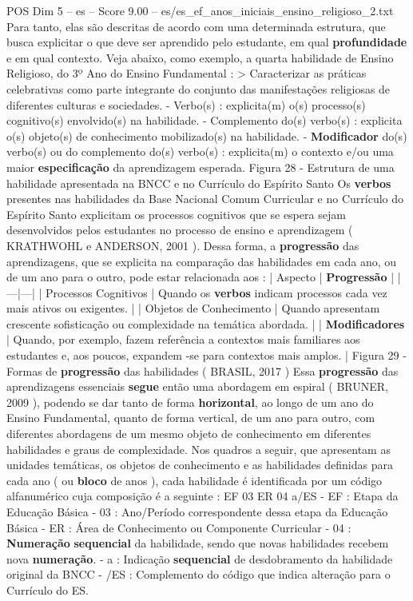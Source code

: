 \begin{textsample}{POS Dim 5 – es – Score 9.00 – es/es\_ef\_anos\_iniciais\_ensino\_religioso\_2.txt}
Para tanto, elas são descritas de acordo com uma determinada estrutura, que busca explicitar o que deve ser aprendido pelo estudante, em qual \textbf{profundidade} e em qual contexto.
Veja abaixo, como exemplo, a quarta habilidade de Ensino Religioso, do 3º Ano do Ensino Fundamental : > Caracterizar as práticas celebrativas como parte integrante do conjunto das manifestações religiosas de diferentes culturas e sociedades. - Verbo(s) : explicita(m) o(s) processo(s) cognitivo(s) envolvido(s) na habilidade. - Complemento do(s) verbo(s) : explicita o(s) objeto(s) de conhecimento mobilizado(s) na habilidade. - \textbf{Modificador} do(s) verbo(s) ou do complemento do(s) verbo(s) : explicita(m) o contexto e/ou uma maior \textbf{especificação} da aprendizagem esperada.
Figura 28 - Estrutura de uma habilidade apresentada na BNCC e no Currículo do Espírito Santo Os \textbf{verbos} presentes nas habilidades da Base Nacional Comum Curricular e no Currículo do Espírito Santo explicitam os processos cognitivos que se espera sejam desenvolvidos pelos estudantes no processo de ensino e aprendizagem ( KRATHWOHL e ANDERSON, 2001 ).
Dessa forma, a \textbf{progressão} das aprendizagens, que se explicita na comparação das habilidades em cada ano, ou de um ano para o outro, pode estar relacionada aos : | Aspecto | \textbf{Progressão} | |---|---| | Processos Cognitivos | Quando os \textbf{verbos} indicam processos cada vez mais ativos ou exigentes. | | Objetos de Conhecimento | Quando apresentam crescente sofisticação ou complexidade na temática abordada. | | \textbf{Modificadores} | Quando, por exemplo, fazem referência a contextos mais familiares aos estudantes e, aos poucos, expandem -se para contextos mais amplos. | Figura 29 - Formas de \textbf{progressão} das habilidades ( BRASIL, 2017 ) Essa \textbf{progressão} das aprendizagens essenciais \textbf{segue} então uma abordagem em espiral ( BRUNER, 2009 ), podendo se dar tanto de forma \textbf{horizontal}, ao longo de um ano do Ensino Fundamental, quanto de forma vertical, de um ano para outro, com diferentes abordagens de um mesmo objeto de conhecimento em diferentes habilidades e graus de complexidade.
Nos quadros a seguir, que apresentam as unidades temáticas, os objetos de conhecimento e as habilidades definidas para cada ano ( ou \textbf{bloco} de anos ), cada habilidade é identificada por um código alfanumérico cuja composição é a seguinte : EF 03 ER 04 a/ES - EF : Etapa da Educação Básica - 03 : Ano/Período correspondente dessa etapa da Educação Básica - ER : Área de Conhecimento ou Componente Curricular - 04 : \textbf{Numeração} \textbf{sequencial} da habilidade, sendo que novas habilidades recebem nova \textbf{numeração}. - a : Indicação \textbf{sequencial} de desdobramento da habilidade original da BNCC - /ES : Complemento do código que indica alteração para o Currículo do ES.

\end{textsample}
